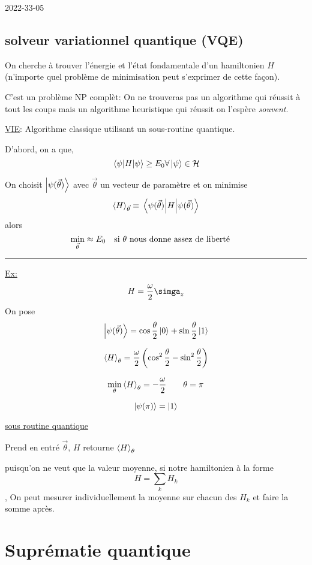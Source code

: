 


2022-33-05

\setcounter{section}{2}
\setcounter{subsection}{15}


\subsection{solveur variationnel quantique (VQE)}

On cherche à trouver l'énergie et l'état fondamentale d'un hamiltonien $H$ (n'importe quel problème de minimisation peut s'exprimer de cette façon).

C'est un problème NP complèt: On ne trouveras pas un algorithme qui réussit à tout les coups mais un algorithme heuristique qui réussit on l'espère \textit{souvent}.

\underline{VIE}: Algorithme classique utilisant un sous-routine quantique.

\begin{tcolorbox}[title=Rappel: Principe variationnel]
D'abord, on a que,
	$$\mel{\psi}{H}{\psi} \geq E_0 \forall \ket{\psi} \in \mathcal{H} $$ 

	On choisit $\ket{\psi(\vec\theta)}$ avec $\vec\theta$ un vecteur de paramètre et on minimise $$\expval{H}_{\vec{\theta}} \equiv \mel{\psi(\vec\theta)}{H}{\psi(\vec\theta)}$$ 
	alors $$\min_{\vec\theta} \approx E_0 \qq{si $\theta$ nous donne assez de liberté }$$ 
\end{tcolorbox}

	\hrule
	\underline{Ex:} $$H = \frac{\omega}{2} \simga_z$$  
	On pose
	$$\ket{\psi(\vec\theta)} = \cos \frac{\theta}{2} \ket{0} + \sin \frac{\theta}{2} \ket{1} $$ 

	$$\expval{H}_\theta = \frac{\omega}{2} \left( \cos^{2}\frac{\theta}{2} - \sin^{2} \frac{\theta}{2}  \right)  $$ 

	$$\min_{\theta} \expval{H}_\theta = -\frac{\omega}{2} \qquad \theta = \pi$$ 

$$\ket{\psi(\pi)}= \ket{1}$$ 

\underline{sous routine quantique} 

Prend en entré $\vec \theta,\, H$ 
retourne $\expval H _\theta $ 

puisqu'on ne veut que la valeur moyenne, si notre hamiltonien à la forme $$H = \sum_k H_k$$, On peut mesurer individuellement la moyenne sur chacun des $H_k$ et faire la somme après. 


\section{Suprématie quantique}

